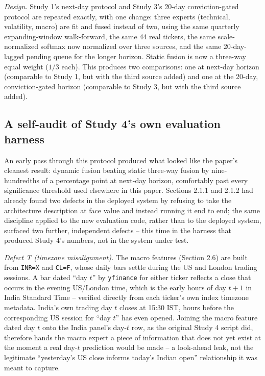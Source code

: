\documentclass[10pt,a4paper,twocolumn]{article}
\begin{document}
\textit{Design.} Study 1's next-day protocol and Study 3's 20-day conviction-gated protocol are repeated exactly, with one change: three experts (technical, volatility, macro) are fit and fused instead of two, using the same quarterly expanding-window walk-forward, the same 44 real tickers, the same scale-normalized softmax now normalized over three sources, and the same 20-day-lagged pending queue for the longer horizon. Static fusion is now a three-way equal weight ($1/3$ each). This produces two comparisons: one at next-day horizon (comparable to Study 1, but with the third source added) and one at the 20-day, conviction-gated horizon (comparable to Study 3, but with the third source added).

\subsection{A self-audit of Study 4's own evaluation harness}
\label{sec:leakaudit}

An early pass through this protocol produced what looked like the paper's cleanest result: dynamic fusion beating static three-way fusion by nine-hundredths of a percentage point at next-day horizon, comfortably past every significance threshold used elsewhere in this paper. Sections 2.1.1 and 2.1.2 had already found two defects in the deployed system by refusing to take the architecture description at face value and instead running it end to end; the same discipline applied to the new evaluation code, rather than to the deployed system, surfaced two further, independent defects -- this time in the harness that produced Study 4's numbers, not in the system under test.

\textit{Defect T (timezone misalignment).} The macro features (Section 2.6) are built from \texttt{INR=X} and \texttt{CL=F}, whose daily bars settle during the US and London trading sessions. A bar dated ``day $t$'' by \texttt{yfinance} for either ticker reflects a close that occurs in the evening US/London time, which is the early hours of day $t{+}1$ in India Standard Time -- verified directly from each ticker's own index timezone metadata. India's own trading day $t$ closes at 15:30 IST, hours before the corresponding US session for ``day $t$'' has even opened. Joining the macro feature dated day $t$ onto the India panel's day-$t$ row, as the original Study 4 script did, therefore hands the macro expert a piece of information that does not yet exist at the moment a real day-$t$ prediction would be made -- a look-ahead leak, not the legitimate ``yesterday's US close informs today's Indian open'' relationship it was meant to capture.
\end{document}

